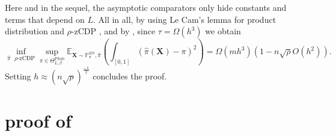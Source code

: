 \documentclass[10pt]{article} %
\def\Ind{\mathds{1}}
\newcommand{\Prob}[0]{\mathbb{P}}
\newcommand{\E}[0]{\mathbb{E}}
\newcommand\vect[1]{\mathbf{#1}}
\newcommand\tv[2]{\mathrm{TV}\left( {#1}, {#2} \right)}
\newcommand\p[1]{\left( {#1}\right)}
\newcommand\RG[1]{\textcolor{red}{#1}}
\newcommand\CL[1]{\textcolor{blue}{#1}}
\begin{document}
Here and in the sequel, the asymptotic comparators only hide constants and terms that depend on $L$.
All in all, by using Le Cam's lemma for product distribution and $\rho$-zCDP , and by , since $\tau = \Omega(h^3)$ we obtain
\begin{equation}
    \inf_{\hat{\pi} \text{ $\rho$-zCDP}} \sup_{\pi \in  \Theta^{\text{PSob}}_{L, \beta}}
    \E_{\vect{X} \sim \Prob_{\pi}^{\otimes n}, \hat{\pi}}\p{ \int_{[0, 1]}\p{\hat{\pi}(\vect{X})- \pi}^2} = \Omega \p{m h^{3}} \p{1 - n \sqrt{\rho} O \p{h^{2}}}.
\end{equation}
Setting $h \approx \p{n \sqrt{\rho}}^{\frac{-1}{2}}$ concludes the proof.
    

\section{proof of }
\label{proofoflemma:projectionutility}
\end{document}
